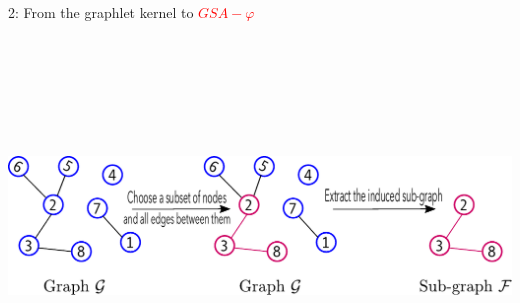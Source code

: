 \documentclass[final,dvipsnames]{beamer}
\newcommand{\myemph}[1]{\textcolor{red}{#1}}
\begin{document}
\begin{frame}{}
\begin{columns}[t]
\begin{column}{0.45\linewidth}
\begin{block}{2: From the graphlet kernel to \myemph{$GSA-\varphi$}}
\begin{minipage}{.99\linewidth}
		\begin{center}
			\includegraphics[height=10cm]{figs/subgraphs.pdf}
		\end{center}
	

\end{minipage}
\end{block}
\end{column}
\end{columns}
\end{frame}
\end{document}
